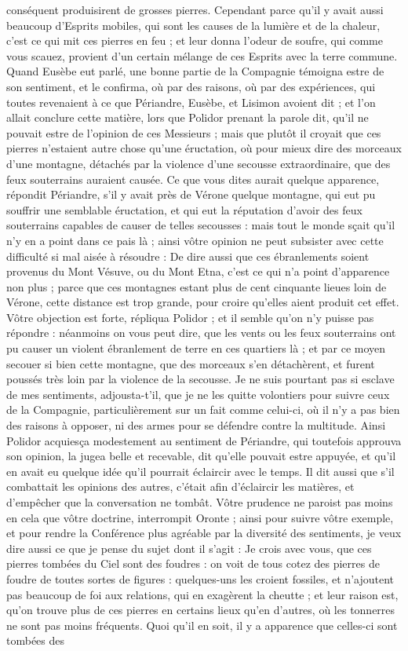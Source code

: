 \documentclass[a4paper, 11pt, oneside, polutonikogreek, french]{article}
\begin{document}
conséquent produisirent de grosses pierres. Cependant parce qu'il y avait aussi beaucoup d'Esprits mobiles, qui sont les causes de la lumière et de la chaleur, c'est ce qui mit ces pierres en feu ; et leur donna l'odeur de soufre, qui comme vous scauez, provient d'un certain mélange de ces Esprits avec la terre commune. Quand Eusèbe eut parlé, une bonne partie de la Compagnie témoigna estre de son sentiment, et le confirma, où par des raisons, où par des expériences, qui toutes revenaient à ce que Périandre, Eusèbe, et Lisimon avoient dit ; et l'on allait conclure cette matière, lors que Polidor prenant la parole dit, qu'il ne pouvait estre de l'opinion de ces Messieurs ; mais que plutôt il croyait que ces pierres n'estaient autre chose qu'une éructation, où pour mieux dire des morceaux d'une montagne, détachés par la violence d'une secousse extraordinaire, que des feux souterrains auraient causée. Ce que vous dites aurait quelque apparence, répondit Périandre, s'il y avait près de Vérone quelque montagne, qui eut pu souffrir une semblable éructation, et qui eut la réputation d'avoir des feux souterrains capables de causer de telles secousses : mais tout le monde sçait qu'il n'y en a point dans ce pais là ; ainsi vôtre opinion ne peut subsister avec cette difficulté si mal aisée à résoudre : De dire aussi que ces ébranlements soient provenus du Mont Vésuve, ou du Mont Etna, c'est ce qui n'a point d'apparence non plus ; parce que ces montagnes estant plus de cent cinquante lieues loin de Vérone, cette distance est trop grande, pour croire qu'elles aient produit cet effet. Vôtre objection est forte, répliqua Polidor ; et il semble qu'on n'y puisse pas répondre : néanmoins on vous peut dire, que les vents ou les feux souterrains ont pu causer un violent ébranlement de terre en ces quartiers là ; et par ce moyen secouer si bien cette montagne, que des morceaux s'en détachèrent, et furent poussés très loin par la violence de la secousse. Je ne suis pourtant pas si esclave de mes sentiments, adjousta-t'il, que je ne les quitte volontiers pour suivre ceux de la Compagnie, particulièrement sur un fait comme celui-ci, où il n'y a pas bien des raisons à opposer, ni des armes pour se défendre contre la multitude. Ainsi Polidor acquiesça modestement au sentiment de Périandre, qui toutefois approuva son opinion, la jugea belle et recevable, dit qu'elle pouvait estre appuyée, et qu'il en avait eu quelque idée qu'il pourrait éclaircir avec le temps. Il dit aussi que s'il combattait les opinions des autres, c'était afin d'éclaircir les matières, et d'empêcher que la conversation ne tombât. Vôtre prudence ne paroist pas moins en cela que vôtre doctrine, interrompit Oronte ; ainsi pour suivre vôtre exemple, et pour rendre la Conférence plus agréable par la diversité des sentiments, je veux dire aussi ce que je pense du sujet dont il s'agit : Je crois avec vous, que ces pierres tombées du Ciel sont des foudres : on voit de tous cotez des pierres de foudre de toutes sortes de figures : quelques-uns les croient fossiles, et n'ajoutent pas beaucoup de foi aux relations, qui en exagèrent la cheutte ; et leur raison est, qu'on trouve plus de ces pierres en certains lieux qu'en d'autres, où les tonnerres ne sont pas moins fréquents. Quoi qu'il en soit, il y a apparence que celles-ci sont tombées des 
\end{document}
